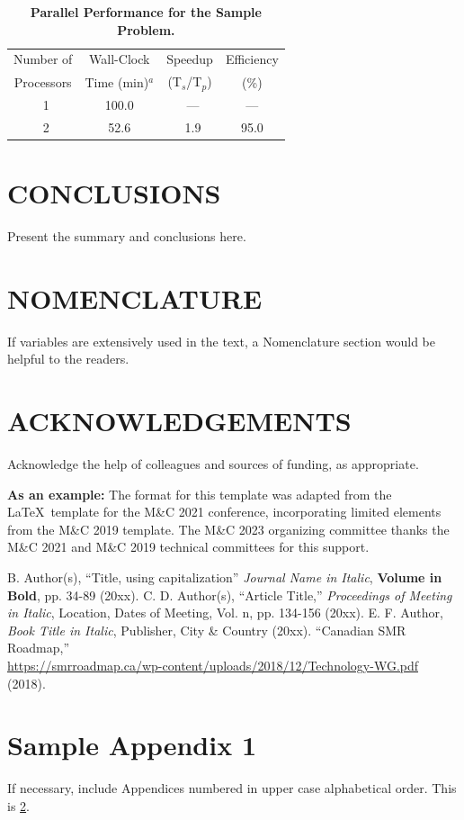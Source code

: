 \documentclass[letterpaper]{mc2023}
\begin{document}
\begin{table}[!htb]
  \centering
  \caption{\bf Parallel Performance for the Sample Problem.}
  \label{table:example} 
  \begin{tabular}{|c|c|c|c|} \hline 
   Number of & Wall-Clock & Speedup & Efficiency \\
   Processors & Time (min)$^a$& (T$_{s}$/T$_{p}$) & (\%) \\ \hline
    \ 1 &  100.0 & \ ---    & ---  \\ \hline
    \ 2 &   52.6 & \ 1.9    & 95.0 \\ \hline 
  \end{tabular}
\end{table}

\section{CONCLUSIONS}

Present the summary and conclusions here.

\section*{NOMENCLATURE}

If variables are extensively used in the text, a Nomenclature section would be helpful to the readers.

\section*{ACKNOWLEDGEMENTS}

Acknowledge the help of colleagues and sources of funding, as appropriate.

\textbf{As an example:} The format for this template was adapted from the \LaTeX\ template for the M\&C 2021
conference, incorporating limited elements from the M\&C 2019 template.  The M\&C 2023 organizing committee
thanks the M\&C 2021 and M\&C 2019 technical committees for this support.

\newif\ifusebibtex
\usebibtexfalse

\ifusebibtex
\setlength{\baselineskip}{12pt}


\else
\setlength{\baselineskip}{12pt}
\begin{thebibliography}{300}
 B. Author(s), ``Title, using capitalization'' \emph{Journal Name in Italic}, 
  \textbf{Volume in Bold}, pp. 34-89 (20xx).
 C. D. Author(s), ``Article Title,'' \emph{Proceedings of
  Meeting in Italic}, Location, Dates of Meeting, Vol. n, pp. 134-156 
  (20xx).
 E. F. Author, \emph{Book Title in Italic}, Publisher, City \&
  Country (20xx). 
 ``Canadian SMR Roadmap,'' \\
  \url{https://smrroadmap.ca/wp-content/uploads/2018/12/Technology-WG.pdf} (2018).
\end{thebibliography}
\fi

\appendix
\gdef\thesection{APPENDIX~\Alph{section}}
\section{Sample Appendix 1}
\label{app:a}
If necessary, include Appendices numbered in upper case alphabetical order. This is \ref{app:a}. 
\end{document}
